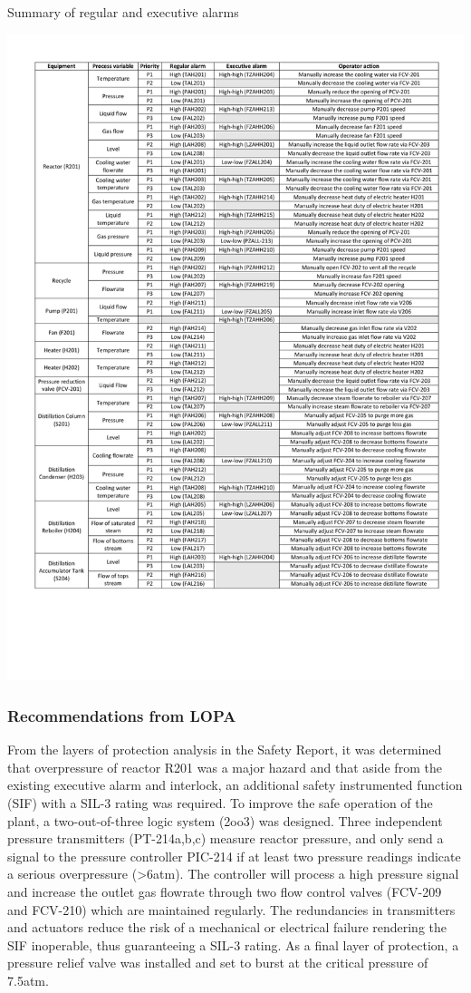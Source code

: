 \begin{table}[H]
  \caption{Summary of regular and executive alarms}
\includegraphics[clip, trim=1cm 4cm 1cm 1cm,  width=\linewidth]{chapters/4-operation-control/4-Figures/Alarms.pdf}
\label{tab:alarms}
\end{table}

\subsubsection{Recommendations from LOPA} %
From the layers of protection analysis in the Safety Report, it was determined that overpressure of reactor R201 was a major hazard and that aside from the existing executive alarm and interlock, an additional safety instrumented function (SIF) with a SIL-3 rating was required. To improve the safe operation of the plant, a two-out-of-three logic system (2oo3) was designed. Three independent pressure transmitters (PT-214a,b,c) measure reactor pressure, and only send a signal to the pressure controller PIC-214 if at least two pressure readings indicate a serious overpressure (>6atm). The controller will process a high pressure signal and increase the outlet gas flowrate through two flow control valves (FCV-209 and FCV-210) which are maintained regularly. The redundancies in transmitters and actuators reduce the risk of a mechanical or electrical failure rendering the SIF inoperable, thus guaranteeing a SIL-3 rating. As a final layer of protection, a pressure relief valve was installed and set to burst at the critical pressure of 7.5atm.